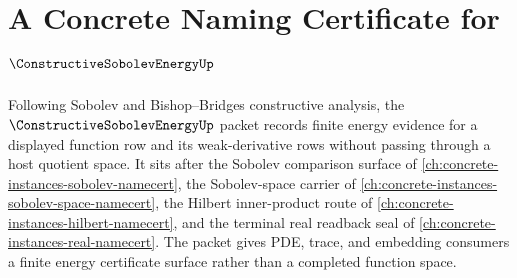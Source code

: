 \chapter{A Concrete Naming Certificate for $\ConstructiveSobolevEnergyUp$}
\label{ch:concrete-instances-constructive-sobolev-energy-namecert}

Following Sobolev and Bishop--Bridges constructive analysis, the $\ConstructiveSobolevEnergyUp$ packet records finite energy evidence for a displayed function row and its weak-derivative rows without passing through a host quotient space. It sits after the Sobolev comparison surface of \autoref{ch:concrete-instances-sobolev-namecert}, the Sobolev-space carrier of \autoref{ch:concrete-instances-sobolev-space-namecert}, the Hilbert inner-product route of \autoref{ch:concrete-instances-hilbert-namecert}, and the terminal real readback seal of \autoref{ch:concrete-instances-real-namecert}. The packet gives PDE, trace, and embedding consumers a finite energy certificate surface rather than a completed function space.

